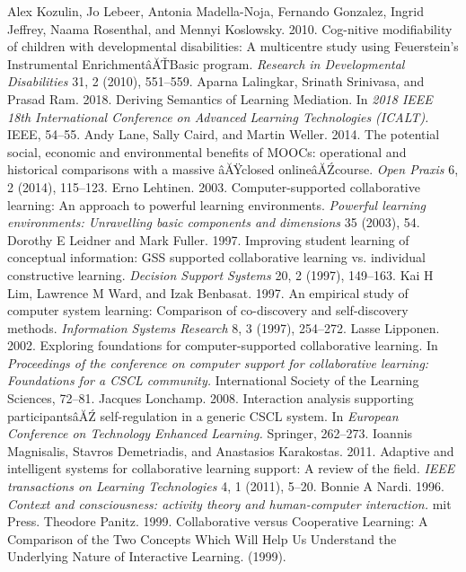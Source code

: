 \begin{multicols}{2}
\begin{thebibliography}{99}
 Alex Kozulin, Jo Lebeer, Antonia Madella-Noja, Fernando Gonzalez, Ingrid Jeffrey, Naama Rosenthal, and Mennyi Koslowsky. 2010. Cog-nitive modifiability of children with developmental disabilities: A multicentre study using Feuerstein’s Instrumental EnrichmentâĂŤBasic program. \textit{Research in Developmental Disabilities} 31, 2 (2010), 551–559.
 Aparna Lalingkar, Srinath Srinivasa, and Prasad Ram. 2018. Deriving Semantics of Learning Mediation. In \textit{2018 IEEE 18th International Conference on Advanced Learning Technologies (ICALT).} IEEE, 54–55.
 Andy Lane, Sally Caird, and Martin Weller. 2014. The potential social, economic and environmental benefits of MOOCs: operational and historical comparisons with a massive âĂŸclosed onlineâĂŹcourse. \textit{Open Praxis} 6, 2 (2014), 115–123.
 Erno Lehtinen. 2003. Computer-supported collaborative learning: An approach to powerful learning environments. \textit{Powerful learning environments: Unravelling basic components and dimensions} 35 (2003), 54.
 Dorothy E Leidner and Mark Fuller. 1997. Improving student learning of conceptual information: GSS supported collaborative learning vs. individual constructive learning. \textit{Decision Support Systems} 20, 2 (1997), 149–163.
 Kai H Lim, Lawrence M Ward, and Izak Benbasat. 1997. An empirical study of computer system learning: Comparison of co-discovery and self-discovery methods. \textit{Information Systems Research} 8, 3 (1997), 254–272.
 Lasse Lipponen. 2002. Exploring foundations for computer-supported collaborative learning. In \textit{Proceedings of the conference on computer support for collaborative learning: Foundations for a CSCL community.} International Society of the Learning Sciences, 72–81.
 Jacques Lonchamp. 2008. Interaction analysis supporting participantsâĂŹ self-regulation in a generic CSCL system. In \textit{European Conference on Technology Enhanced Learning.} Springer, 262–273.
 Ioannis Magnisalis, Stavros Demetriadis, and Anastasios Karakostas. 2011. Adaptive and intelligent systems for collaborative learning support: A review of the field. \textit{IEEE transactions on Learning Technologies} 4, 1 (2011), 5–20.
 Bonnie A Nardi. 1996. \textit{Context and consciousness: activity theory and human-computer interaction.} mit Press.
 Theodore Panitz. 1999. Collaborative versus Cooperative Learning: A Comparison of the Two Concepts Which Will Help Us Understand the Underlying Nature of Interactive Learning. (1999).

\end{thebibliography}
\end{multicols}
